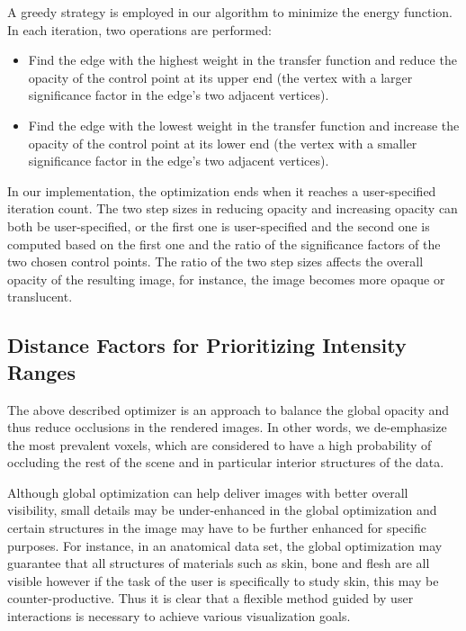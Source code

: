 A greedy strategy is employed in our algorithm to minimize the energy function. In each iteration, two operations are performed:
\begin{itemize}
\item Find the edge with the highest weight in the transfer function and reduce the opacity of the control point at its upper end (the vertex with a larger significance factor in the edge's two adjacent vertices).
\item Find the edge with the lowest weight in the transfer function and increase the opacity of the control point at its lower end (the vertex with a smaller significance factor in the edge's two adjacent vertices).
\end{itemize}

In our implementation, the optimization ends when it reaches a user-specified iteration count.
The two step sizes in reducing opacity and increasing opacity can both be user-specified, or the first one is user-specified and the second one is computed based on the first one and the ratio of the significance factors of the two chosen control points. The ratio of the two step sizes affects the overall opacity of the resulting image, for instance, the image becomes more opaque or translucent.

\subsection{Distance Factors for Prioritizing Intensity Ranges}
\label{interaction_methods}
The above described optimizer is an approach to balance the global opacity and thus reduce occlusions in the rendered images. In other words, we de-emphasize the most prevalent voxels, which are considered to have a high probability of occluding the rest of the scene and in particular interior structures of the data.

Although global optimization can help deliver images with better overall visibility, small details may be under-enhanced in the global optimization and certain structures in the image may have to be further enhanced for specific purposes. For instance, in an anatomical data set, the global optimization may guarantee that all structures of materials such as skin, bone and flesh are all visible however if the task of the user is specifically to study skin, this may be counter-productive. Thus it is clear that a flexible method guided by user interactions is necessary to achieve various visualization goals. 

